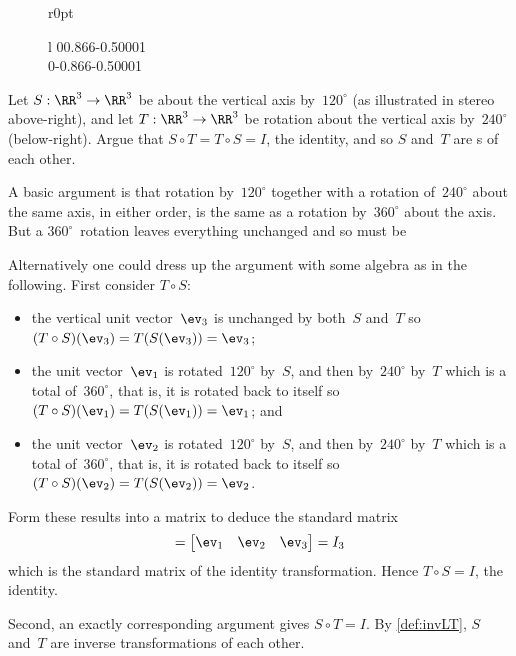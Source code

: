\begin{wrapfigure}[12]r{0pt}
\begin{tabular}l
0{0.866}{-0.5}0001
\\
0{-0.866}{-0.5}0001
\end{tabular}
\end{wrapfigure}
\begin{example}  
Let \(S:\RR^3\to\RR^3\) be  about the vertical axis by~\(120^\circ\) (as illustrated in stereo above-right), 
and let \(T:\RR^3\to\RR^3\) be rotation about the vertical axis by~\(240^\circ\) (below-right).
Argue that \(S\circ T=T\circ S=I\), the identity, and so \(S\) 
and~\(T\) are s of each other.

\begin{solution} 
A basic argument is that rotation by~\(120^\circ\) together with a rotation of~\(240^\circ\) about the same axis, in either order, is the same as a rotation by~\(360^\circ\) about the axis.
But a \(360^\circ\)~rotation leaves everything unchanged and so must be 

Alternatively one could dress up the argument with some algebra as in the following.
First consider \(T\circ S\):
\begin{itemize}
\item the vertical unit vector~\(\ev_3\) is unchanged by both~\(S\) and~\(T\) so \((T\circ S)(\ev_3)=T(S(\ev_3))=\ev_3\);
\item the unit vector~\(\ev_1\) is rotated~\(120^\circ\) by~\(S\), and then by~\(240^\circ\) by~\(T\) which is a total of~\(360^\circ\), that is, it is rotated back to itself so \((T\circ S)(\ev_1)=T(S(\ev_1))=\ev_1\); and
\item the unit vector~\(\ev_2\) is rotated~\(120^\circ\) by~\(S\), and then by~\(240^\circ\) by~\(T\) which is a total of~\(360^\circ\), that is, it is rotated back to itself so \((T\circ S)(\ev_2)=T(S(\ev_2))=\ev_2\).
\end{itemize}
Form these results into a matrix to deduce the standard matrix
\begin{equation*}
[T\circ S]=\begin{bmatrix} \ev_1&\ev_2&\ev_3 \end{bmatrix}
=I_3
\end{equation*}
which is the standard matrix of the identity transformation.
Hence \(T\circ S=I\), the identity.

Second, an exactly corresponding argument gives  \(S\circ T=I\).
By \cref{def:invLT}, \(S\) and~\(T\) are inverse transformations of each other.
\end{solution}
\end{example}


